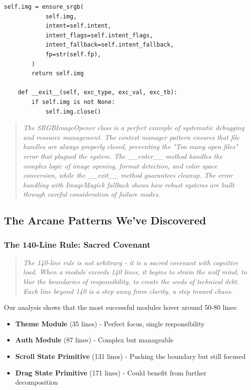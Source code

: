 \documentclass[11pt]{article}
\begin{document}
\begin{lstlisting}[style=python]
        self.img = ensure_srgb(
            self.img,
            intent=self.intent,
            intent_flags=self.intent_flags,
            intent_fallback=self.intent_fallback,
            fp=str(self.fp),
        )
        return self.img
    
    def __exit__(self, exc_type, exc_val, exc_tb):
        if self.img is not None:
            self.img.close()
\end{lstlisting}

\begin{quote}
\emph{The SRGBImageOpener class is a perfect example of systematic debugging and resource management. The context manager pattern ensures that file handles are always properly closed, preventing the "Too many open files" error that plagued the system. The \_\_enter\_\_ method handles the complex logic of image opening, format detection, and color space conversion, while the \_\_exit\_\_ method guarantees cleanup. The error handling with ImageMagick fallback shows how robust systems are built through careful consideration of failure modes.}
\end{quote}

\subsection{The Arcane Patterns We've Discovered}

\subsubsection{The 140-Line Rule: Sacred Covenant}

\begin{quote}
\emph{The 140-line rule is not arbitrary - it is a sacred covenant with cognitive load. When a module exceeds 140 lines, it begins to strain the wolf mind, to blur the boundaries of responsibility, to create the seeds of technical debt. Each line beyond 140 is a step away from clarity, a step toward chaos.}
\end{quote}

Our analysis shows that the most successful modules hover around 50-80 lines:

\begin{itemize}
\item \textbf{Theme Module} (35 lines) - Perfect focus, single responsibility
\item \textbf{Auth Module} (87 lines) - Complex but manageable
\item \textbf{Scroll State Primitive} (131 lines) - Pushing the boundary but still focused
\item \textbf{Drag State Primitive} (171 lines) - Could benefit from further decomposition
\end{itemize}
\end{document}
